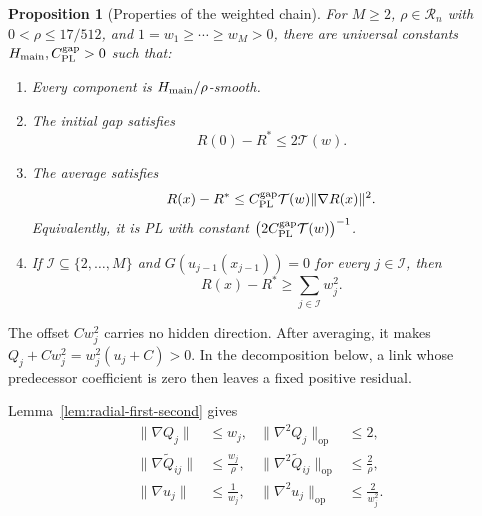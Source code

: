 \documentclass{article}
\newtheorem{proposition}[theorem]{Proposition}
\theoremstyle{definition}
\newcommand{\op}{\mathrm{op}}
\begin{document}
\begin{proposition}[Properties of the weighted chain]
\label{prop:weighted-chain-properties}
For $M\ge2$, $\rho\in\mathcal R_n$ with $0<\rho\le17/512$, and
$1=w_1\ge\cdots\ge w_M>0$, there are universal constants
$H_{\rm main},C_{\rm PL}^{\rm gap}>0$ such that:
\begin{enumerate}[label=\textup{(\roman*)},leftmargin=*,itemsep=2pt]
 \item\label{item:weighted-property-smoothness}
 Every component is $H_{\rm main}/\rho$-smooth.
 \item\label{item:weighted-property-gap}
 The initial gap satisfies
 \begin{equation}
  R(0)-R^*\le2\mathcal T(w).
  \label{eq:weighted-property-gap}
 \end{equation}
 \item\label{item:weighted-property-pl}
 The average satisfies
 \begin{equation}
  R(x)-R^*
  \le C_{\rm PL}^{\rm gap}\mathcal T(w)\|\nabla R(x)\|^2.
  \label{eq:weighted-property-pl}
 \end{equation}
 Equivalently, it is PL with constant
 $\bigl(2C_{\rm PL}^{\rm gap}\mathcal T(w)\bigr)^{-1}$.
 \item\label{item:weighted-property-residual}
 If $\mathcal I\subseteq\{2,\ldots,M\}$ and
 $G(u_{j-1}(x_{j-1}))=0$ for every $j\in\mathcal I$, then
 \begin{equation}
  R(x)-R^*\ge\sum_{j\in\mathcal I}w_j^2.
  \label{eq:weighted-property-residual}
 \end{equation}
\end{enumerate}
\end{proposition}

The offset $Cw_j^2$ carries no hidden direction.  After averaging, it makes
$Q_j+Cw_j^2=w_j^2(u_j+C)>0$.  In the decomposition below, a link
whose predecessor coefficient is zero then leaves a fixed positive residual.

Lemma~\ref{lem:radial-first-second} gives
\begin{align}
 \|\nabla Q_j\|&\le w_j,
 &\|\nabla^2Q_j\|_{\op}&\le2,\nonumber\\
 \|\nabla\widetilde Q_{ij}\|&\le\frac{w_j}{\rho},
 &\|\nabla^2\widetilde Q_{ij}\|_{\op}&\le\frac2\rho,\nonumber\\
 \|\nabla u_j\|&\le\frac1{w_j},
 &\|\nabla^2u_j\|_{\op}&\le\frac2{w_j^2}.
 \label{eq:weighted-derivatives}
\end{align}
\end{document}
